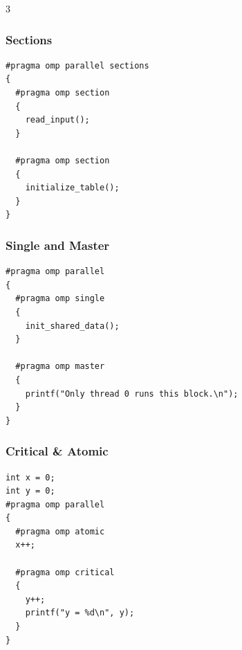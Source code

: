 \documentclass[12pt, a4paper]{article}
\begin{document}
\begin{multicols*}{3}
\colbreak

\subsubsection{Sections}
\begin{lstlisting}[basicstyle=\ttfamily\scriptsize]
#pragma omp parallel sections
{
  #pragma omp section
  {
    read_input();
  }

  #pragma omp section
  {
    initialize_table();
  }
}
\end{lstlisting}

\subsubsection{Single and Master}
\begin{lstlisting}[basicstyle=\ttfamily\scriptsize]
#pragma omp parallel
{
  #pragma omp single
  {
    init_shared_data();
  }

  #pragma omp master
  {
    printf("Only thread 0 runs this block.\n");
  }
}
\end{lstlisting}

\subsubsection{Critical \& Atomic}
\begin{lstlisting}[basicstyle=\ttfamily\scriptsize]
int x = 0;
int y = 0;
#pragma omp parallel
{
  #pragma omp atomic
  x++;

  #pragma omp critical
  {
    y++;
    printf("y = %d\n", y);
  }
}
\end{lstlisting}

\colbreak

\end{multicols*}
\end{document}
